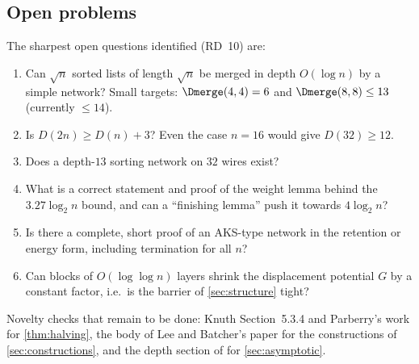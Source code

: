 \subsection{Open problems}

The sharpest open questions identified (RD~10) are:
\begin{enumerate}
    \item Can $\sqrt{n}$ sorted lists of length $\sqrt{n}$ be merged in depth $O(\log n)$ by a simple network? Small targets: $\Dmerge(4,4) = 6$ and $\Dmerge(8,8) \le 13$ (currently $\le 14$).
    \item Is $D(2n) \ge D(n) + 3$? Even the case $n = 16$ would give $D(32) \ge 12$.
    \item Does a depth-$13$ sorting network on $32$ wires exist?
    \item What is a correct statement and proof of the weight lemma behind the $3.27\log_2 n$ bound, and can a ``finishing lemma'' push it towards $4\log_2 n$?
    \item Is there a complete, short proof of an AKS-type network in the retention or energy form, including termination for all $n$?
    \item Can blocks of $O(\log\log n)$ layers shrink the displacement potential $G$ by a constant factor, i.e.\ is the barrier of \cref{sec:structure} tight?
\end{enumerate}
Novelty checks that remain to be done: Knuth Section~5.3.4 and Parberry's work for \cref{thm:halving}, the body of Lee and Batcher's paper for the constructions of \cref{sec:constructions}, and the depth section of \cite{kahale1995lower} for \cref{sec:asymptotic}.

